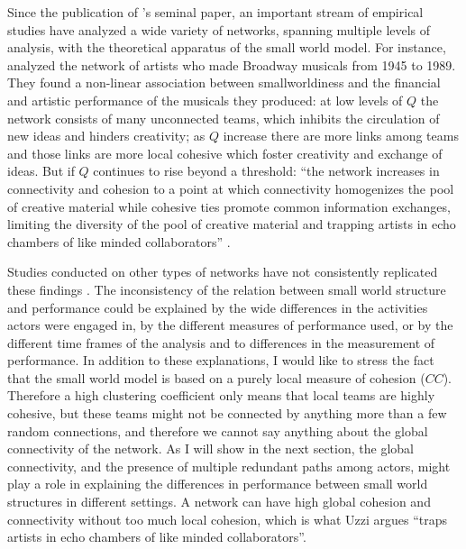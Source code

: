 Since the publication of \citeauthor{watts:1998}'s seminal paper, an important stream of empirical studies have analyzed a wide variety of networks, spanning multiple levels of analysis, with the theoretical apparatus of the small world model. For instance, \citet{uzzi:2005} analyzed the network of artists who made Broadway musicals from 1945 to 1989. They found a non-linear association between smallworldiness and the financial and artistic performance of the musicals they produced: at low levels of $Q$ the network consists of many unconnected teams, which inhibits the circulation of new ideas and hinders creativity; as $Q$ increase there are more links among teams and those links are more local cohesive which foster creativity and exchange of ideas. But if $Q$ continues to rise beyond a threshold: ``the network increases in connectivity and cohesion to a point at which connectivity homogenizes the pool of creative material while cohesive ties promote common information exchanges, limiting the diversity of the pool of creative material and trapping artists in echo chambers of like minded collaborators'' \citep[87]{uzzi:2007}.

Studies conducted on other types of networks have not consistently replicated these findings \citep*[for a recent review see][]{uzzi:2007}. The inconsistency of the relation between small world structure and performance could be explained by the wide differences in the activities actors were engaged in, by the different measures of performance used, or by the different time frames of the analysis and to differences in the measurement of performance. In addition to these explanations, I would like to stress the fact that the small world model is based on a purely local measure of cohesion ($CC$). Therefore a high clustering coefficient only means that local teams are highly cohesive, but these teams might not be connected by anything more than a few random connections, and therefore we cannot say anything about the global connectivity of the network. As I will show in the next section, the global connectivity, and the presence of multiple redundant paths among actors, might play a role in explaining the differences in performance between small world structures in different settings. A network can have high global cohesion and connectivity without too much local cohesion, which is what Uzzi argues ``traps artists in echo chambers of like minded collaborators''.


